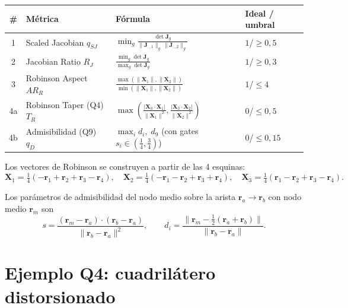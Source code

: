 \documentclass[11pt,a4paper]{article}
\begin{document}
\begin{center}
\renewcommand{\arraystretch}{1.25}
\begin{tabular}{clll}
\toprule
\# & \textbf{M\'etrica} & \textbf{F\'ormula} & \textbf{Ideal / umbral} \\
\midrule
1 & Scaled Jacobian $q_{SJ}$ & $\displaystyle\min_g \frac{\det\mathbf{J}_g}{\|\mathbf{J}_{:,1}\|_g\,\|\mathbf{J}_{:,2}\|_g}$ & $1$\;/\;$\ge 0{,}5$ \\[6pt]
2 & Jacobian Ratio $R_J$ & $\displaystyle\frac{\min_g \det\mathbf{J}_g}{\max_g \det\mathbf{J}_g}$ & $1$\;/\;$\ge 0{,}3$ \\[6pt]
3 & Robinson Aspect $AR_R$ & $\displaystyle\frac{\max(\|\mathbf{X}_1\|,\|\mathbf{X}_2\|)}{\min(\|\mathbf{X}_1\|,\|\mathbf{X}_2\|)}$ & $1$\;/\;$\le 4$ \\[6pt]
4a & Robinson Taper (Q4) $T_R$ & $\displaystyle\max\!\left(\frac{|\mathbf{X}_3\!\cdot\!\mathbf{X}_1|}{\|\mathbf{X}_1\|^2},\frac{|\mathbf{X}_3\!\cdot\!\mathbf{X}_2|}{\|\mathbf{X}_2\|^2}\right)$ & $0$\;/\;$\le 0{,}5$ \\[6pt]
4b & Admisibilidad (Q9) $q_D$ & $\max_i d_i,\;d_9$ (con gates $s_i\!\in\!(\tfrac{1}{4},\tfrac{3}{4})$) & $0$\;/\;$\le 0{,}15$ \\
\bottomrule
\end{tabular}
\end{center}

\noindent Los vectores de Robinson se construyen a partir de las 4 esquinas:
\begin{equation}
\mathbf{X}_1 = \tfrac{1}{4}(-\mathbf{r}_1+\mathbf{r}_2+\mathbf{r}_3-\mathbf{r}_4),\quad
\mathbf{X}_2 = \tfrac{1}{4}(-\mathbf{r}_1-\mathbf{r}_2+\mathbf{r}_3+\mathbf{r}_4),\quad
\mathbf{X}_3 = \tfrac{1}{4}(\mathbf{r}_1-\mathbf{r}_2+\mathbf{r}_3-\mathbf{r}_4).
\label{eq:X123}
\end{equation}

\noindent Los par\'ametros de admisibilidad del nodo medio sobre la arista $\mathbf{r}_a\!\to\!\mathbf{r}_b$ con nodo medio $\mathbf{r}_m$ son
\begin{equation}
s = \frac{(\mathbf{r}_m-\mathbf{r}_a)\cdot(\mathbf{r}_b-\mathbf{r}_a)}{\|\mathbf{r}_b-\mathbf{r}_a\|^2},\qquad
d_i = \frac{\|\mathbf{r}_m - \tfrac{1}{2}(\mathbf{r}_a+\mathbf{r}_b)\|}{\|\mathbf{r}_b-\mathbf{r}_a\|}.
\label{eq:s_di}
\end{equation}

\section{Ejemplo Q4: cuadril\'atero distorsionado}
\label{sec:q4}
\end{document}
